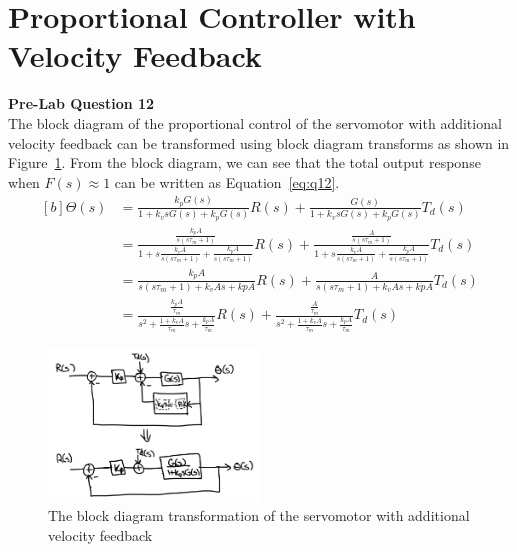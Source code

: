 \documentclass[12pt]{article}
\begin{document}
\section{Proportional Controller with Velocity Feedback}
\textbf{Pre-Lab Question 12} \\
The block diagram of the proportional control of the servomotor with additional velocity feedback can be transformed using block diagram transforms as shown in Figure~\ref{fig:q12}. From the block diagram, we can see that the total output response when $F(s) \approx 1$ can be written as Equation~\ref{eq:q12}.
\begin{equation} \label{eq:q12}
\begin{aligned}[b]
    \Theta(s) &= \frac{k_pG(s)}{1 + k_vsG(s) + k_pG(s)}R(s) + \frac{G(s)}{1 + k_vsG(s) + k_pG(s)}T_d(s) \\
    &= \frac{\frac{k_pA}{s(s\tau_m + 1)}}{1 + s\frac{k_vA}{s(s\tau_m + 1)} + \frac{k_pA}{s(s\tau_m + 1)}}R(s) + \frac{\frac{A}{s(s\tau_m + 1)}}{1 + s\frac{k_vA}{s(s\tau_m + 1)} + \frac{k_pA}{s(s\tau_m + 1)}}T_d(s) \\
    &= \frac{k_pA}{s(s\tau_m + 1) + k_vAs + kpA}R(s) + \frac{A}{s(s\tau_m + 1) + k_vAs + kpA}T_d(s) \\
    &= \frac{\frac{k_pA}{\tau_m}}{s^2 + \frac{1+k_vA}{\tau_m}s + \frac{k_pA}{\tau_m}}R(s) + \frac{\frac{A}{\tau_m}}{s^2 + \frac{1+k_vA}{\tau_m}s + \frac{k_pA}{\tau_m}}T_d(s)
\end{aligned}
\end{equation}
\begin{figure}[h!]
    \centering
    \includegraphics[width=0.5\textwidth]{q12}
    \caption{\label{fig:q12}The block diagram transformation of the servomotor with additional velocity feedback}
\end{figure}
\end{document}
